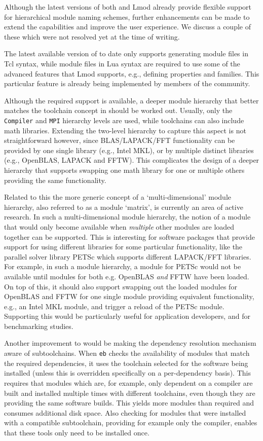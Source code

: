 Although the latest versions of both \easybuild{} and Lmod already provide
flexible support for hierarchical module naming schemes, further enhancements can
be made to extend the capabilities and improve the user experience. We discuss
a couple of these which were not resolved yet at the time of writing.

The latest available version of \easybuild{} to date only supports generating
module files in Tcl syntax, while module files in Lua syntax are required to use
some of the advanced features that Lmod supports, e.g., defining properties and
families. This particular feature is already being implemented by members of the
\easybuild{} community.

Although the required support is available, a deeper module hierarchy that
better matches the toolchain concept in \easybuild{} should be worked out.
Usually, only the \texttt{Compiler} and \texttt{MPI} hierarchy levels are used,
while \easybuild{} toolchains can also include math libraries. Extending
the two-level hierarchy to capture this aspect is not straightforward however,
since BLAS/LAPACK/FFT functionality can be provided by one single library (e.g.,
Intel MKL), or by multiple distinct libraries (e.g., OpenBLAS, LAPACK and FFTW).
This complicates the design of a deeper hierarchy that supports swapping one
math library for one or multiple others providing the same functionality.

Related to this the more generic concept of a `multi-dimensional' module hierarchy,
also referred to as a module `matrix', is currently an area of active research.
In such a multi-dimensional module hierarchy, the notion of a module that would
only become available when \emph{multiple} other modules are loaded together can be
supported. This is interesting for software packages that provide support for using
different libraries for some particular functionality, like the parallel
solver library PETSc which supports different LAPACK/FFT libraries. For example,
in such a module hierarchy, a module for PETSc would not be available until modules
for both e.g. OpenBLAS \emph{and} FFTW have been loaded. On top of this, it should
also support swapping out the loaded modules for OpenBLAS and FFTW for one single
module providing equivalent functionality, e.g., an Intel MKL module, and trigger a
reload of the PETSc module. Supporting this would be particularly useful for
application developers, and for benchmarking studies.

Another improvement to \easybuild{} would be making the dependency resolution
mechanism aware of subtoolchains. When \texttt{eb} checks the availability of
modules that match the required dependencies, it uses the toolchain selected
for the software being installed (unless this is overridden specifically on a
per-dependency basis). This requires that modules which are, for example, only
dependent on a compiler are built and installed multiple times with different
toolchains, even though they are providing the same software builds. This yields
more modules than required and consumes additional disk space. Also checking for
modules that were installed with a compatible subtoolchain, providing for example
only the compiler, enables that these tools only need to be installed once.

